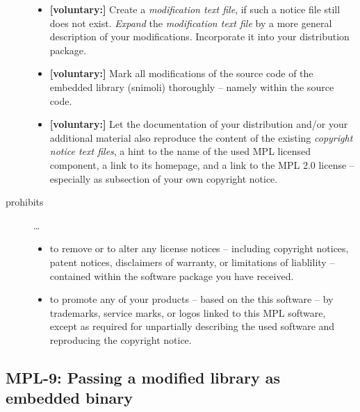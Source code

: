\begin{description}
\begin{itemize}
  \item \textbf{[voluntary:]} Create a \emph{modification text file}, if such a
  notice file still does not exist. \emph{Expand} the \emph{modification text
  file} by a more general description of your modifications. Incorporate it into
  your distribution package.
  
  \item \textbf{[voluntary:]} Mark all modifications of the source code of the
  embedded library (snimoli) thoroughly -- namely within the source code.
      
  \item \textbf{[voluntary:]} Let the documentation of your distribution and/or
  your additional material also reproduce the content of the existing
  \emph{copyright notice text files}, a hint to the name of the used MPL
  licensed component, a link to its homepage, and a link to the MPL 2.0 license
  -- especially as subsection of your own copyright notice.
 
\end{itemize}

\item[prohibits] \ldots
\begin{itemize}
  \item to remove or to alter any license notices -- including copyright
  notices, patent notices, disclaimers of warranty, or limitations of liablility
  -- contained within the software package you have received.
  \item to promote any of your products -- based on the this software -- by
  trademarks, service marks, or logos linked to this MPL software, except as
  required for unpartially describing the used software and reproducing the
  copyright notice.
\end{itemize}

\end{description}


\subsection{MPL-9: Passing a modified library as embedded binary}
\label{OSUC-10B-MPL}

